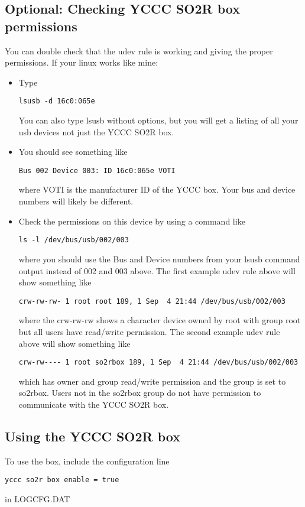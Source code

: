 \documentclass[12pt]{article}
\begin{document}
\subsection{Optional: Checking YCCC SO2R box permissions}
You can double check that the udev rule is working and
giving the proper permissions. If your linux works like mine:
\begin{itemize}
\item
Type
\begin{verbatim}
lsusb -d 16c0:065e
\end{verbatim}
You can also type lsusb without options,
but you will get a listing of all your usb
devices not just the YCCC SO2R box.
\item
You should see something like
\begin{verbatim}
Bus 002 Device 003: ID 16c0:065e VOTI
\end{verbatim}
where VOTI is the manufacturer ID of the YCCC box. Your bus and device
numbers will likely be different.
\item
Check the permissions on this device by using a command like
\begin{verbatim}
ls -l /dev/bus/usb/002/003
\end{verbatim}
where you should use the Bus and Device numbers from your lsusb command
output instead of 002 and 003 above.
The first example udev rule above will show something like
\begin{verbatim}
crw-rw-rw- 1 root root 189, 1 Sep  4 21:44 /dev/bus/usb/002/003
\end{verbatim}
where the crw-rw-rw shows a character device owned by root with group root
but all users have read/write permission.
The second example udev rule above will show something like
\begin{verbatim}
crw-rw---- 1 root so2rbox 189, 1 Sep  4 21:44 /dev/bus/usb/002/003
\end{verbatim}
which has owner and group read/write permission and the group is set
to so2rbox. Users not in the so2rbox group do not have
permission to communicate with the
YCCC SO2R box.
\end{itemize}

\subsection{Using the YCCC SO2R box}
To use the box, include the configuration line
\begin{verbatim}
yccc so2r box enable = true
\end{verbatim}
in LOGCFG.DAT
\end{document}
